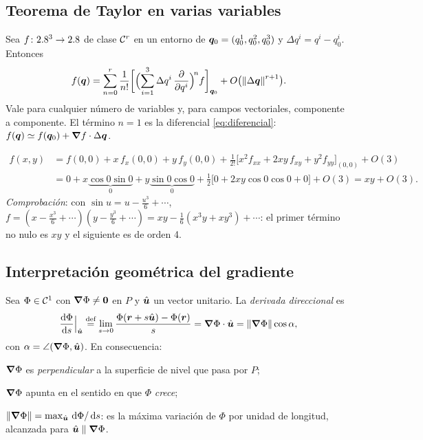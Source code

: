 \subsection{Teorema de Taylor en varias variables}

\begin{teorema}[Taylor]
\label{teo:taylor}
Sea $f\colon2.8^{3}\to2.8$ de clase $\mathcal{C}^{r}$ en un entorno de
$\bm{q}_{0}=(q^{1}_{0},q^{2}_{0},q^{3}_{0})$ y $\Delta q^{i}=q^{i}-q^{i}_{0}$.
Entonces
\begin{equation}
  f(\bm{q})=\sum_{n=0}^{r}\frac{1}{n!}
  \biggl[\Bigl(\sum_{i=1}^{3}\Delta q^{i}\,\frac{\partial }{\partial q^{i}}\Bigr)^{\!n}f\biggr]_{\bm{q}_{0}}
  +O\bigl(\left\lVert \Delta\bm{q}\right\rVert^{r+1}\bigr).
  \label{eq:taylor}
\end{equation}
Vale para cualquier número de variables y, para campos vectoriales,
componente a componente. El término $n=1$ es la diferencial
\eqref{eq:diferencial}: $f(\bm{q})\simeq f(\bm{q}_{0})+\bm{\nabla} f\cdot\Delta\bm{q}$.
\end{teorema}

\begin{ejemplo}[$f(x,y)=\sin x\sin y$ hasta orden 2 en $(0,0)$]
\begin{align*}
  f(x,y)&=f(0,0)+x\,f_{x}(0,0)+y\,f_{y}(0,0)
  +\tfrac{1}{2!}\bigl[x^{2}f_{xx}+2xy\,f_{xy}+y^{2}f_{yy}\bigr]_{(0,0)}+O(3)\\
  &=0+x\underbrace{\cos0\sin0}_{0}+y\underbrace{\sin0\cos0}_{0}
  +\tfrac{1}{2}\bigl[0+2xy\cos0\cos0+0\bigr]+O(3)=xy+O(3).
\end{align*}
\emph{Comprobación}: con $\sin u=u-\tfrac{u^{3}}{6}+\cdots$,
$f=(x-\tfrac{x^{3}}{6}+\cdots)(y-\tfrac{y^{3}}{6}+\cdots)=xy-\tfrac{1}{6}(x^{3}y+xy^{3})+\cdots$:
el primer término no nulo es $xy$ y el siguiente es de orden 4.
\end{ejemplo}

\subsection{Interpretación geométrica del gradiente}

\begin{proposicion}
\label{prop:geom-grad}
Sea $\Phi\in\mathcal{C}^{1}$ con $\bm{\nabla}\Phi\neq\bm{0}$ en $P$ y $\hat{\bm{u}}$ un vector
unitario. La \emph{derivada direccional} es
\begin{equation}
  \frac{\mathop{}\!\mathrm{d} \Phi}{\mathop{}\!\mathrm{d} s}\Big|_{\hat{\bm{u}}}\stackrel{\text{def}}{=}\lim_{s\to0}\frac{\Phi(\bm{r}+s\hat{\bm{u}})-\Phi(\bm{r})}{s}
  =\bm{\nabla}\Phi\cdot\hat{\bm{u}}=\left\lVert \bm{\nabla}\Phi\right\rVert\cos\alpha ,
  \label{eq:direccional}
\end{equation}
con $\alpha=\angle(\bm{\nabla}\Phi,\hat{\bm{u}})$. En consecuencia:
\begin{casos}
  \item $\bm{\nabla}\Phi$ es \emph{perpendicular} a la superficie de nivel que pasa por $P$;
  \item $\bm{\nabla}\Phi$ apunta en el sentido en que $\Phi$ \emph{crece};
  \item $\left\lVert \bm{\nabla}\Phi\right\rVert=\max_{\hat{\bm{u}}}\,\mathop{}\!\mathrm{d}\Phi/\mathop{}\!\mathrm{d} s$: es la máxima variación de
        $\Phi$ por unidad de longitud, alcanzada para $\hat{\bm{u}}\parallel\bm{\nabla}\Phi$.
\end{casos}
\end{proposicion}

